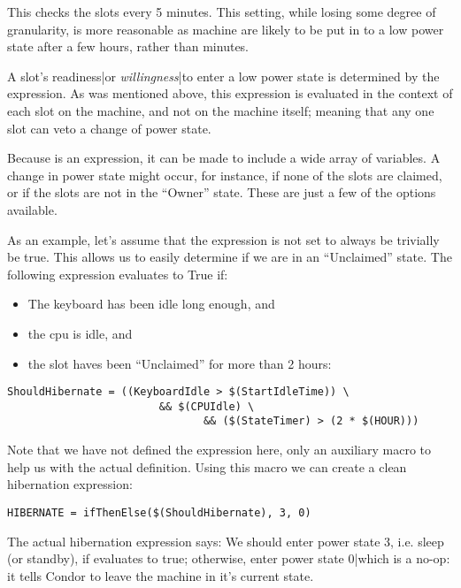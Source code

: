 This checks the slots every 5 minutes.  This setting, while losing some 
degree of granularity, is more reasonable as machine are likely to be put 
in to a low power state after a few hours, rather than minutes.
 
A slot's readiness|or \textit{willingness}|to enter a low power state is 
determined by the  expression.  As was mentioned above, this 
expression is evaluated in the context of each slot on the machine, and not 
on the machine itself; meaning that any one slot can veto a change of power 
state.  

Because  is an expression, it can be made to include a wide
array of variables.  A change in power state might occur, for instance, if 
none of the slots are claimed, or if the slots are not in the ``Owner'' state.
These are just a few of the options available.

As an example, let's assume that the  expression is not set to
always be trivially be true.  This allows us to easily determine if
we are in an ``Unclaimed'' state.  The following expression evaluates
to True if:

\begin{itemize}
\item The keyboard has been idle long enough, and
\item the cpu is idle, and
\item the slot haves been ``Unclaimed'' for more than 2 hours:
\end{itemize}

\begin{verbatim}
ShouldHibernate = ((KeyboardIdle > $(StartIdleTime)) \
                        && $(CPUIdle) \
                               && ($(StateTimer) > (2 * $(HOUR)))
\end{verbatim}

Note that we have not defined the  expression here, only an 
auxiliary macro to help us with the actual definition.  Using this macro we 
can create a clean hibernation expression:

\begin{verbatim}
HIBERNATE = ifThenElse($(ShouldHibernate), 3, 0)
\end{verbatim} %

The actual hibernation expression says: We should enter power state $3$,
i.e. sleep (or standby), if  evaluates to true; 
otherwise, enter power state $0$|which is a no-op: it tells Condor to leave 
the machine in it's current state. 

